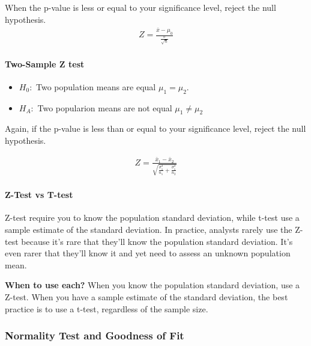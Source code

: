 \documentclass[11pt]{article}
\providecommand{\tightlist}{%
      \setlength{\itemsep}{0pt}\setlength{\parskip}{0pt}}
\begin{document}
When the p-value is less or equal to your significance level, reject the
null hypothesis.
\begin{gather}
  Z = \frac{\bar{x} - \mu_0}{\frac{\sigma}{\sqrt{n}}}
\end{gather}

\hypertarget{two-sample-z-test}{%
\paragraph{Two-Sample Z test}\label{two-sample-z-test}}

\begin{itemize}
\tightlist
\item
  \(H_0:\) Two population means are equal \(\mu_1 = \mu_2\).
\item
  \(H_A:\) Two popularion means are not equal \(\mu_1 \neq \mu_2\)
\end{itemize}

Again, if the p-value is less than or equal to your significance level,
reject the null hypothesis.

\begin{gather}
  Z = \frac{\bar{x}_1 - \bar{x}_2}{\sqrt{\frac{\sigma^2_1}{n_1} + \frac{\sigma^2_1}{n_2}}}
\end{gather}

\hypertarget{z-test-vs-t-test}{%
\paragraph{Z-Test vs T-test}\label{z-test-vs-t-test}}

Z-test require you to know the population standard deviation, while
t-test use a sample estimate of the standard deviation. In practice,
analysts rarely use the Z-test because it's rare that they'll know the
population standard deviation. It's even rarer that they'll know it and
yet need to assess an unknown population mean.

\textbf{When to use each?} When you know the population standard
deviation, use a Z-test. When you have a sample estimate of the standard
deviation, the best practice is to use a t-test, regardless of the
sample size.

\hypertarget{normality-test-and-goodness-of-fit}{%
\subsubsection{Normality Test and Goodness of
Fit}\label{normality-test-and-goodness-of-fit}}
\end{document}
